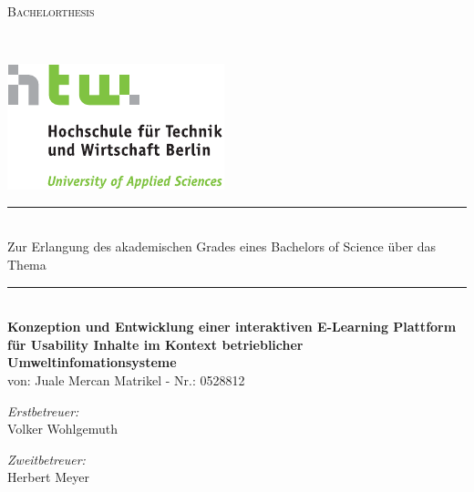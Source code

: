 \newcommand{\HRule}{\rule{\linewidth}{0.0mm}}
\thispagestyle{empty}
\begin{titlepage}
\begin{center}
\textsc{\LARGE Bachelorthesis}\\[0.5cm]
%
\begin{minipage}[t]{\textwidth}
\end{minipage}\\[0.8cm]

\begin{minipage}[c]{0.2\textwidth}

\includegraphics[viewport=0 0 60 60]{HTW_Logo_4c.pdf}

\end{minipage}

\HRule \\[0.2cm]
\large {Zur Erlangung des akademischen Grades eines \linebreak Bachelors of Science \linebreak über das Thema}
%

\HRule \\[0.25 cm]
{ \LARGE \bfseries Konzeption und Entwicklung einer \linebreak interaktiven E-Learning
Plattform \linebreak für Usability Inhalte im Kontext \linebreak betrieblicher
Umweltinfomationsysteme}\\[1.5 cm]%

% 

{von: Juale Mercan \linebreak \small Matrikel - Nr.: 0528812}\\[1.0cm]

\begin{minipage}{0.4\textwidth}
\begin{flushleft} \normalsize
\emph{Erstbetreuer:}\\ Volker Wohlgemuth
\end{flushleft}
\end{minipage}
\begin{minipage}{0.4\textwidth}
\begin{flushright} \normalsize
\emph{Zweitbetreuer:}\\ Herbert Meyer


\end{flushright}
\end{minipage}
\end{center}
\end{titlepage}
